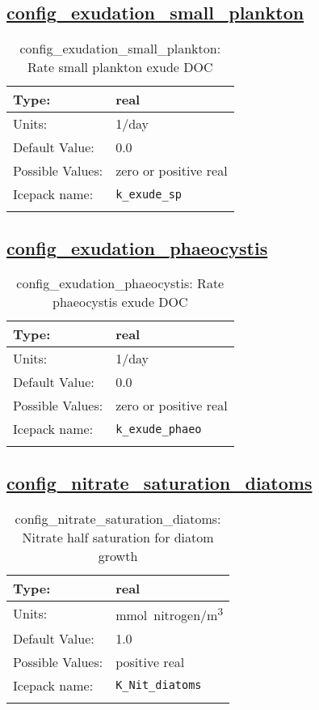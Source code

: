 \subsection[config\_exudation\_small\_plankton]{\hyperref[sec:nm_tab_biogeochemistry]{config\_exudation\_small\_plankton}}
\label{subsec:nm_sec_config_exudation_small_plankton}
\begin{center}
\begin{longtable}{| p{2.0in} || p{4.0in} |}
    \hline
    Type: & real \\
    \hline
    Units: & \si{1/day} \\
    \hline
    Default Value: & 0.0 \\
    \hline
    Possible Values: & zero or positive real \\
    \hline
    \hline
    Icepack name: & \verb+k_exude_sp+ \\
    \caption{config\_exudation\_small\_plankton: Rate small plankton exude DOC}
\end{longtable}
\end{center}
\subsection[config\_exudation\_phaeocystis]{\hyperref[sec:nm_tab_biogeochemistry]{config\_exudation\_phaeocystis}}
\label{subsec:nm_sec_config_exudation_phaeocystis}
\begin{center}
\begin{longtable}{| p{2.0in} || p{4.0in} |}
    \hline
    Type: & real \\
    \hline
    Units: & \si{1/day} \\
    \hline
    Default Value: & 0.0 \\
    \hline
    Possible Values: & zero or positive real \\
    \hline
    \hline
    Icepack name: & \verb+k_exude_phaeo+ \\
    \caption{config\_exudation\_phaeocystis: Rate phaeocystis exude DOC}
\end{longtable}
\end{center}
\subsection[config\_nitrate\_saturation\_diatoms]{\hyperref[sec:nm_tab_biogeochemistry]{config\_nitrate\_saturation\_diatoms}}
\label{subsec:nm_sec_config_nitrate_saturation_diatoms}
\begin{center}
\begin{longtable}{| p{2.0in} || p{4.0in} |}
    \hline
    Type: & real \\
    \hline
    Units: & \si{mmol.nitrogen/m^3} \\
    \hline
    Default Value: & 1.0 \\
    \hline
    Possible Values: & positive real \\
    \hline
    \hline
    Icepack name: & \verb+K_Nit_diatoms+ \\
    \caption{config\_nitrate\_saturation\_diatoms: Nitrate half saturation for diatom growth}
\end{longtable}
\end{center}
